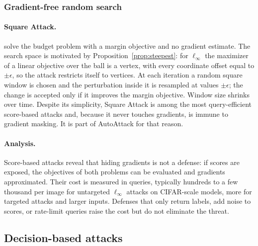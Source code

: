\documentclass[10pt,a4paper]{extarticle}
\theoremstyle{definition}
\begin{document}
\subsubsection{Gradient-free random search}

\paragraph{Square Attack.} \citet{andriushchenko2020square} solve the budget problem with a margin objective and no gradient estimate. The search space is motivated by Proposition~\ref{prop:steepest}: for \(\ell_\infty\) the maximizer of a linear objective over the ball is a vertex, with every coordinate offset equal to \(\pm\epsilon\), so the attack restricts itself to vertices. At each iteration a random square window is chosen and the perturbation inside it is resampled at values \(\pm\epsilon\); the change is accepted only if it improves the margin objective. Window size shrinks over time. Despite its simplicity, Square Attack is among the most query-efficient score-based attacks and, because it never touches gradients, is immune to gradient masking. It is part of AutoAttack for that reason.

\paragraph{Analysis.} Score-based attacks reveal that hiding gradients is not a defense: if scores are exposed, the objectives of both problems can be evaluated and gradients approximated. Their cost is measured in queries, typically hundreds to a few thousand per image for untargeted \(\ell_\infty\) attacks on CIFAR-scale models, more for targeted attacks and larger inputs. Defenses that only return labels, add noise to scores, or rate-limit queries raise the cost but do not eliminate the threat.

\subsection{Decision-based attacks}\label{sec:decision}
\end{document}
